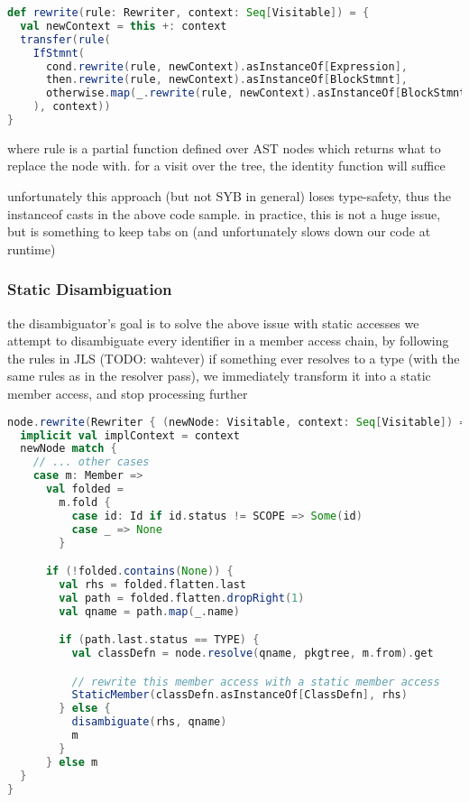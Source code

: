 \documentclass{article}
\begin{document}
\begin{lstlisting}[language=Scala]
def rewrite(rule: Rewriter, context: Seq[Visitable]) = {
  val newContext = this +: context
  transfer(rule(
    IfStmnt(
      cond.rewrite(rule, newContext).asInstanceOf[Expression],
      then.rewrite(rule, newContext).asInstanceOf[BlockStmnt],
      otherwise.map(_.rewrite(rule, newContext).asInstanceOf[BlockStmnt])
    ), context))
}
\end{lstlisting}

where rule is a partial function defined over AST nodes which returns what to replace the node with. for
a visit over the tree, the identity function will suffice

unfortunately this approach (but not SYB in general) loses type-safety, thus the instanceof casts in the
above code sample. in practice, this is not a huge issue, but is something to keep tabs on
(and unfortunately slows down our code at runtime)



\subsubsection{Static Disambiguation}
the disambiguator's goal is to solve the above issue with static accesses
we attempt to disambiguate every identifier in a member access chain, by following the rules in JLS (TODO: wahtever)
if something ever resolves to a type (with the same rules as in the resolver pass), we immediately transform it
into a static member access, and stop processing further

\begin{lstlisting}[language=Scala]
node.rewrite(Rewriter { (newNode: Visitable, context: Seq[Visitable]) =>
  implicit val implContext = context
  newNode match {
    // ... other cases
    case m: Member =>
      val folded =
        m.fold {
          case id: Id if id.status != SCOPE => Some(id)
          case _ => None
        }

      if (!folded.contains(None)) {
        val rhs = folded.flatten.last
        val path = folded.flatten.dropRight(1)
        val qname = path.map(_.name)

        if (path.last.status == TYPE) {
          val classDefn = node.resolve(qname, pkgtree, m.from).get

          // rewrite this member access with a static member access
          StaticMember(classDefn.asInstanceOf[ClassDefn], rhs)
        } else {
          disambiguate(rhs, qname)
          m
        }
      } else m
  }
}
\end{lstlisting}
\end{document}
